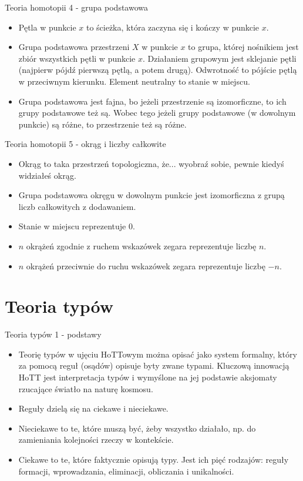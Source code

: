 \documentclass{beamer}
\begin{document}
\begin{frame}{Teoria homotopii 4 - grupa podstawowa}
\begin{itemize}
	\item Pętla w punkcie $x$ to ścieżka, która zaczyna się i kończy w punkcie $x$.
	\item Grupa podstawowa przestrzeni $X$ w punkcie $x$ to grupa, której nośnikiem jest zbiór wszystkich pętli w punkcie $x$. Działaniem grupowym jest sklejanie pętli (najpierw pójdź pierwszą pętlą, a potem drugą). Odwrotność to pójście pętlą w przeciwnym kierunku. Element neutralny to stanie w miejscu.
	\item Grupa podstawowa jest fajna, bo jeżeli przestrzenie są izomorficzne, to ich grupy podstawowe też są. Wobec tego jeżeli grupy podstawowe (w dowolnym punkcie) są różne, to przestrzenie też są różne.
\end{itemize}
\end{frame}

\begin{frame}{Teoria homotopii 5 - okrąg i liczby całkowite}
\begin{itemize}
	\item Okrąg to taka przestrzeń topologiczna, że... wyobraź sobie, pewnie kiedyś widziałeś okrąg.
	\item Grupa podstawowa okręgu w dowolnym punkcie jest izomorficzna z grupą liczb całkowitych z dodawaniem.
	\item Stanie w miejscu reprezentuje $0$.
	\item $n$ okrążeń zgodnie z ruchem wskazówek zegara reprezentuje liczbę $n$.
	\item $n$ okrążeń przeciwnie do ruchu wskazówek zegara reprezentuje liczbę $-n$.
\end{itemize}
\end{frame}

\section{Teoria typów}

\begin{frame}{Teoria typów 1 - podstawy}
\begin{itemize}
	\item Teorię typów w ujęciu HoTTowym można opisać jako system formalny, który za pomocą reguł (osądów) opisuje byty zwane typami. Kluczową innowacją HoTT jest interpretacja typów i wymyślone na jej podstawie aksjomaty rzucające światło na naturę kosmosu.
	\item Reguły dzielą się na ciekawe i nieciekawe.
	\item Nieciekawe to te, które muszą być, żeby wszystko działało, np. do zamieniania kolejności rzeczy w kontekście.
	\item Ciekawe to te, które faktycznie opisują typy. Jest ich pięć rodzajów: reguły formacji, wprowadzania, eliminacji, obliczania i unikalności.
\end{itemize}
\end{frame}
\end{document}
